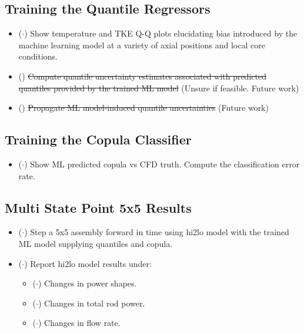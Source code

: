 \subsection{Training the Quantile Regressors}

\begin{itemize}
    \item ($\cdot$) Show temperature and TKE Q-Q plots elucidating bias introduced by the machine learning model at a variety of axial positions and local core conditions.
    \item (\xmark) \sout{Compute quantile uncertainty estimates associated with predicted quantiles provided by the trained ML model} (Unsure if feasible. Future work)
    \item (\xmark) \sout{Propagate ML model-induced quantile uncertainties} (Future work)
\end{itemize}

\subsection{Training the Copula Classifier}

\begin{itemize}
    \item ($\cdot$)  Show ML predicted copula vs CFD truth.  Compute the classification error rate.
\end{itemize}

\subsection{Multi State Point 5x5 Results}

\begin{itemize}
    \item ($\cdot$) Step a 5x5 assembly forward in time using hi2lo model with the trained ML model supplying quantiles and copula.
    \item ($\cdot$) Report hi2lo model results under:
    \begin{itemize}
        \item ($\cdot$) Changes in power shapes.
        \item ($\cdot$) Changes in total rod power.
        \item ($\cdot$) Changes in flow rate.
    \end{itemize}

\end{itemize}

